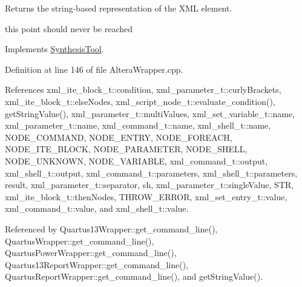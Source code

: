 Returns the string-\/based representation of the X\+ML element. 

this point should never be reached 

Implements \hyperlink{classSynthesisTool_a98c5ba46f950300e1a5ca7cfcb409852}{Synthesis\+Tool}.



Definition at line 146 of file Altera\+Wrapper.\+cpp.



References xml\+\_\+ite\+\_\+block\+\_\+t\+::condition, xml\+\_\+parameter\+\_\+t\+::curly\+Brackets, xml\+\_\+ite\+\_\+block\+\_\+t\+::else\+Nodes, xml\+\_\+script\+\_\+node\+\_\+t\+::evaluate\+\_\+condition(), get\+String\+Value(), xml\+\_\+parameter\+\_\+t\+::multi\+Values, xml\+\_\+set\+\_\+variable\+\_\+t\+::name, xml\+\_\+parameter\+\_\+t\+::name, xml\+\_\+command\+\_\+t\+::name, xml\+\_\+shell\+\_\+t\+::name, N\+O\+D\+E\+\_\+\+C\+O\+M\+M\+A\+ND, N\+O\+D\+E\+\_\+\+E\+N\+T\+RY, N\+O\+D\+E\+\_\+\+F\+O\+R\+E\+A\+CH, N\+O\+D\+E\+\_\+\+I\+T\+E\+\_\+\+B\+L\+O\+CK, N\+O\+D\+E\+\_\+\+P\+A\+R\+A\+M\+E\+T\+ER, N\+O\+D\+E\+\_\+\+S\+H\+E\+LL, N\+O\+D\+E\+\_\+\+U\+N\+K\+N\+O\+WN, N\+O\+D\+E\+\_\+\+V\+A\+R\+I\+A\+B\+LE, xml\+\_\+command\+\_\+t\+::output, xml\+\_\+shell\+\_\+t\+::output, xml\+\_\+command\+\_\+t\+::parameters, xml\+\_\+shell\+\_\+t\+::parameters, result, xml\+\_\+parameter\+\_\+t\+::separator, sh, xml\+\_\+parameter\+\_\+t\+::single\+Value, S\+TR, xml\+\_\+ite\+\_\+block\+\_\+t\+::then\+Nodes, T\+H\+R\+O\+W\+\_\+\+E\+R\+R\+OR, xml\+\_\+set\+\_\+entry\+\_\+t\+::value, xml\+\_\+command\+\_\+t\+::value, and xml\+\_\+shell\+\_\+t\+::value.



Referenced by Quartus13\+Wrapper\+::get\+\_\+command\+\_\+line(), Quartus\+Wrapper\+::get\+\_\+command\+\_\+line(), Quartus\+Power\+Wrapper\+::get\+\_\+command\+\_\+line(), Quartus13\+Report\+Wrapper\+::get\+\_\+command\+\_\+line(), Quartus\+Report\+Wrapper\+::get\+\_\+command\+\_\+line(), and get\+String\+Value().


